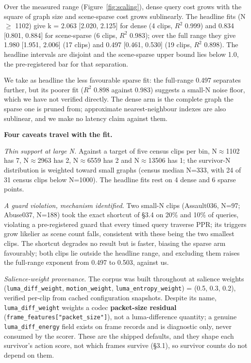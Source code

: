 \documentclass[sigconf,review,anonymous]{acmart}
\begin{document}
Over the measured range (Figure~\ref{fig:scaling}), dense query cost grows with the square of graph size and
scene-sparse cost grows sublinearly. The headline fits (N \ensuremath{\geq} 1102) give k = 2.063 {[}2.020, 2.125{]} for dense
(4 clips, $R^2$ 0.999) and 0.834 {[}0.801, 0.884{]} for scene-sparse (6 clips, $R^2$ 0.983); over the full
range they give 1.980 {[}1.951, 2.006{]} (17 clips) and 0.497 {[}0.461, 0.530{]} (19 clips, $R^2$ 0.898).
The headline intervals are disjoint and the
scene-sparse upper bound lies below 1.0, the pre-registered bar for that separation.

We take as headline the less favourable sparse fit: the full-range 0.497 separates further,
but its poorer fit ($R^2$ 0.898 against 0.983) suggests a small-N noise floor, which we have not
verified directly. The dense arm is the complete graph the sparse one is pruned from; approximate
nearest-neighbour indexes are also sublinear, and we make no latency claim against them.

\textbf{Four caveats travel with the fit.}

\emph{Thin support at large N.} Against a target of five census clips per bin, N\ensuremath{\approx}1102 has 7, N\ensuremath{\approx}2963 has
2, N\ensuremath{\approx}6559 has 2 and N\ensuremath{\approx}13506 has 1; the survivor-N distribution is weighted toward small
graphs (census median N=333, with 24 of 31 census clips below N=1000). The headline fits rest on 4 dense
and 6 sparse points.

\emph{A guard violation, mechanism identified.} Two small-N clips (Assault036, N=97; Abuse037,
N=188) took the exact shortcut of §3.4 on 20\% and 10\% of queries, violating a pre-registered
guard that every timed query traverse PPR; its triggers grow likelier as scene count falls,
consistent with these being the two smallest clips. The shortcut degrades no result but is
faster, biasing the sparse arm favourably; both clips lie outside the headline range, and
excluding them raises the full-range exponent from 0.497 to 0.503, against us.

\emph{Salience-weight provenance.} The corpus was built throughout at salience weights
(\texttt{luma\_diff\_weight}, \texttt{motion\_weight}, \texttt{luma\_entropy\_weight}) = (0.5, 0.3, 0.2), verified
per-clip from cached configuration snapshots. Despite its name, \texttt{luma\_diff\_weight} weights a
codec \textbf{packet-size residual} (\texttt{frame\_features{[}"packet\_size"{]}}), not a luma-difference
quantity; a genuine \texttt{luma\_diff\_energy} field exists on frame records and is diagnostic only,
never consumed by the scorer. These are the shipped defaults, and they shape each survivor's
action score, not which frames survive (§3.1), so survivor counts do not depend on them.
\end{document}
